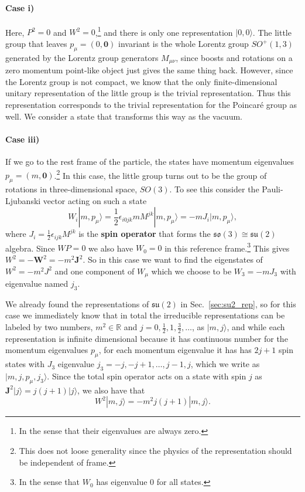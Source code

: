 \documentclass[notes.tex]{subfiles}
\begin{document}
\paragraph{Case i)} Here, $P^2=0$ and $W^2=0$,\footnote{In the sense that their eigenvalues are always zero.} and there is only one representation $|0,0\rangle$. The little group that leaves $p_\mu=(0,\mathbf 0)$ invariant is the whole Lorentz group $SO^+(1,3)$ generated by the Lorentz group generators $M_{\mu\nu}$, since boosts and rotations on a zero momentum point-like object just gives the same thing back. However, since the Lorentz group is not compact, we know that the only finite-dimensional unitary representation of the little group is the trivial representation. Thus this representation corresponds to the trivial representation for the Poincaré group as well. We consider a state that transforms this way as the vacuum.

\paragraph{Case iii)} If we go to the rest frame of the particle, the states have momentum eigenvalues $p_\mu=(m, \mathbf 0)$.\footnote{This does not loose generality since the physics of the representation should be independent of frame.}  In this case, the little group turns out to be the group of rotations in three-dimensional space, $SO(3)$. To see this consider the Pauli-Ljubanski vector acting on such a state
\begin{equation}
W_i |m, p_\mu\rangle = \frac{1}{2} \epsilon_{i 0 jk}m M^{jk}  |m, p_\mu\rangle= -mJ_i  |m, p_\mu\rangle,
\label{eq:PL_restframe}
\end{equation}
where $J_i = \frac{1}{2} \epsilon_{ijk} M^{jk}$ is the {\bf spin operator} that forms the $\mathfrak{so}(3)\cong\mathfrak{su}(2)$ algebra. Since $WP=0$ we also have $W_0 = 0$ in this reference frame.\footnote{In the sense that $W_0$ has eigenvalue 0 for all states.} This gives $W^2 = -\mathbf W^2 = -m^2\mathbf J^2$.  So in this case we want to find the eigenstates of $W^2=-m^2J^2$ and one component of $W_\mu$ which we choose to be $W_3=-mJ_3$ with eigenvalue named $j_3$.  

We already found the representations of  $\mathfrak{su}(2)$ in Sec.~\ref{sec:su2_rep}, so for this case we immediately know that in total the irreducible representations can be labeled by two numbers, $m^2\in\mathbb R$ and $j=0,\frac{1}{2},1,\frac{3}{2},\ldots$, as $|m,j\rangle$, and while each representation is infinite dimensional because it has continuous number for the momentum eigenvalues $p_\mu$, for each momentum eigenvalue it has has $2j+1$ spin states with $J_3$ eigenvalue $j_3=-j,-j+1,\ldots,j-1,j$, which we write as $|m,j,p_\mu,j_3\rangle$. 
Since the total spin operator acts on a state with spin $j$ as $\mathbf J^2| j\rangle=j(j+1)| j\rangle$, we also have that
\[W^2|m,j\rangle = -m^2 j(j+1)|m,j\rangle.\]
\end{document}
